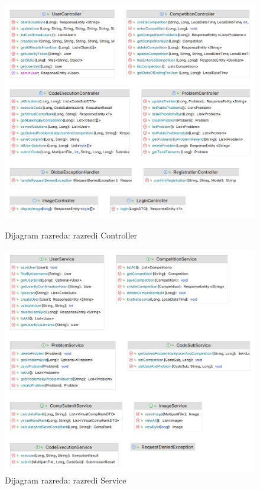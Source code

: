 {			
			\begin{figure}
			\centering
			\begin{minipage}[b]{0.45\textwidth}
				\includegraphics[width=\textwidth]{slike/controlleri}
				\caption{Dijagram razreda: razredi Controller}
				\label{fig:dr1}
			\end{minipage}
			\hfill
			\begin{minipage}[b]{0.45\textwidth}
				\includegraphics[width=\textwidth]{slike/services}
				\caption{Dijagram razreda: razredi Service}
					\label{fig:dr}
			\end{minipage}
			\end{figure}
					
}
